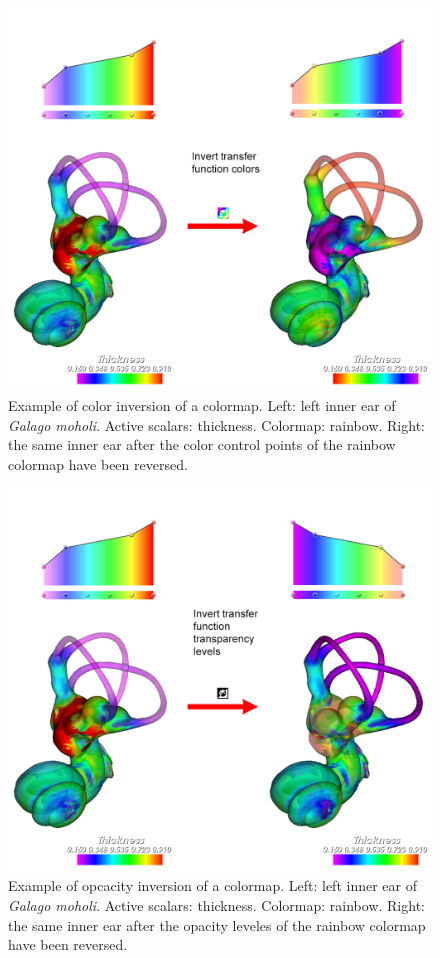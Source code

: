 \begin{figure}
  \centering
  \includegraphics[scale=0.38]{images/11/invert_colors.png} 
	\caption{
Example of color inversion of a colormap.  Left: left inner ear of \textit{Galago moholi}. Active scalars: thickness. Colormap: rainbow. Right: the same inner ear after the color control points of the rainbow colormap have been reversed.}
\label{invert_colors}
 
\end{figure}

\begin{figure}
  \centering
  \includegraphics[scale=0.38]{images/11/invert_transparency.png} 
	\caption{
	Example of opcacity inversion of a colormap.  Left: left inner ear of \textit{Galago moholi}. Active scalars: thickness. Colormap: rainbow. Right: the same inner ear after the opacity leveles of the rainbow colormap have been reversed.}
\label{invert_opacities}
 
\end{figure}

